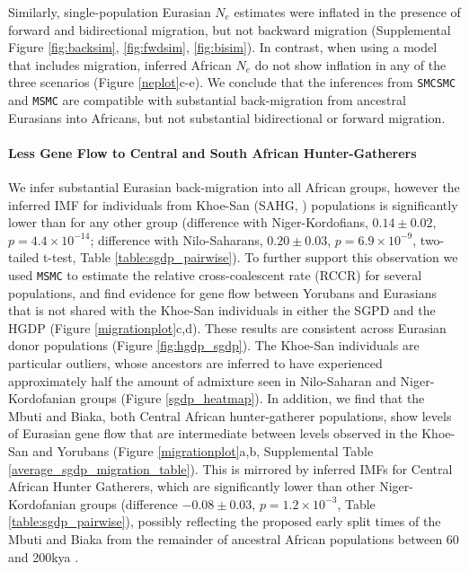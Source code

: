 \documentclass{article}
\begin{document}
Similarly, single-population Eurasian $N_e$ estimates were inflated in the presence of forward and bidirectional migration, but not backward migration (Supplemental Figure \ref{fig:backsim}, \ref{fig:fwdsim}, \ref{fig:bisim}).
In contrast, when using a model that includes migration, inferred African $N_e$ do not show inflation in any of the three scenarios (Figure \ref{neplot}c-e). We conclude that the inferences from {\tt SMCSMC} and {\tt MSMC} are compatible with substantial back-migration from ancestral Eurasians into Africans, but not substantial bidirectional or forward migration.

\paragraph{Less Gene Flow to Central and South African Hunter-Gatherers} We infer substantial Eurasian back-migration into all African groups, however the inferred IMF for individuals from Khoe-San (SAHG, \cite{Schlebusch2012}) populations is significantly lower than for any other group (difference with Niger-Kordofians, $0.14 \pm 0.02$, $p = 4.4 \times 10^{-14}$; difference with Nilo-Saharans, $0.20 \pm 0.03$, $p = 6.9 \times 10^{-9}$, two-tailed t-test, Table \ref{table:sgdp_pairwise}). To further support this observation we used {\tt MSMC} to estimate the relative cross-coalescent rate (RCCR) for several populations, and find evidence for gene flow between Yorubans and Eurasians that is not shared with the Khoe-San individuals in either the SGPD and the HGDP (Figure \ref{migrationplot}c,d). These results are consistent across Eurasian donor populations (Figure \ref{fig:hgdp_sgdp}). The Khoe-San individuals are particular outliers, whose ancestors are inferred to have experienced approximately half the amount of admixture seen in Nilo-Saharan and Niger-Kordofanian groups (Figure \ref{sgdp_heatmap}). 
In addition, we find that the Mbuti and Biaka, both Central African hunter-gatherer populations, show levels of Eurasian gene flow that are intermediate between levels observed in the Khoe-San and Yorubans (Figure \ref{migrationplot}a,b, Supplemental Table \ref{average_sgdp_migration_table}).  This is mirrored by inferred IMFs for Central African Hunter Gatherers, which are significantly lower than other Niger-Kordofanian groups (difference $-0.08 \pm 0.03$, $p = 1.2 \times 10^{-3}$, Table \ref{table:sgdp_pairwise}), possibly reflecting the proposed early split times of the Mbuti and Biaka from the remainder of ancestral African populations between 60 and 200kya \cite{Patin2017, Lipson2019}. 
\end{document}
